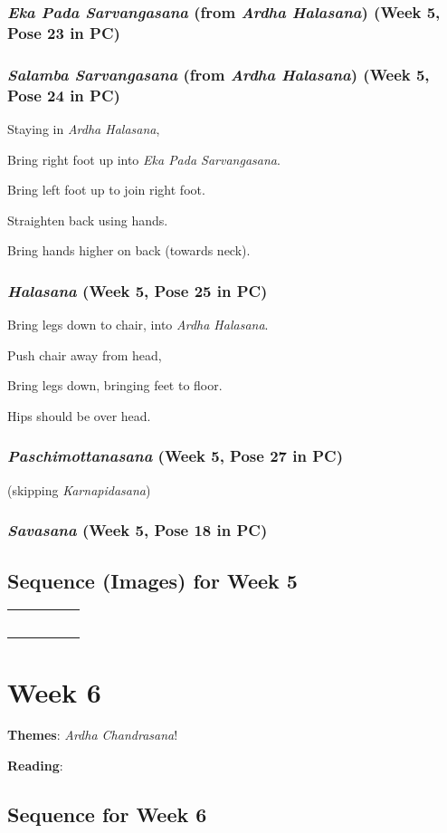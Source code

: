 \documentclass{book}
\newcommand{\apose}[1]{\emph{#1}}
\newcommand{\ardhal}{\apose{Ardha Halasana}}
\newcommand{\ardchand}{\apose{Ardha Chandrasana}}
\newcommand{\ekapadsarv}{\apose{Eka Pada Sarvangasana}}
\newcommand{\hal}{\apose{Halasana}}
\newcommand{\karn}{\apose{Karnapidasana}}
\newcommand{\paschi}{\apose{Paschimottanasana}}
\newcommand{\sarv}{\apose{Salamba Sarvangasana}}
\newcommand{\sav}{\apose{Savasana}}
\newcommand{\poseFig}[1]{
  \begin{minipage}{1.0in}
    \texttt{[image: Figures/\{"\#1"]}.jpg}
    \captionof{figure}{{#1}}
    \label{fig:\theweek.#1}
    \vspace{1ex}
  \end{minipage}
}
\newcommand{\amsFig}{\poseFig{Adho Mukha Svanasana}}
\newcommand{\ardhalFig}{\poseFig{Ardha Halasana}}
\newcommand{\ekapadsarvFig}{\poseFig{Eka Pada Sarvangasana}}
\newcommand{\gomuFig}{\poseFig{Gomukasana}}
\newcommand{\halFig}{\poseFig{Halasana}}
\newcommand{\namFig}{\poseFig{Namaskarasana}}
\newcommand{\padangFig}{\poseFig{Padangusthasana}}
\newcommand{\paschiFig}{\poseFig{Paschimottanasana}}
\newcommand{\paschbadhastFig}{\poseFig{Paschima Baddha Hastasana}}
\newcommand{\paschnamaFig}{\poseFig{Paschima Namaskarasana}}
\newcommand{\praspadFig}{\poseFig{Prasarita Padottanasana}}
\newcommand{\sarvFig}{\poseFig{Salamba Sarvangasana}}
\newcommand{\savFig}{\poseFig{Savasana}}
\newcommand{\tadFig}{\poseFig{Tadasana}}
\newcommand{\urdbadFig}{\poseFig{Urdhva Baddhanguliyasana}}
\newcommand{\urdhastFig}{\poseFig{Urdhva Hastasana}}
\newcommand{\urdnamFig}{\poseFig{Urdhva Namaskarasana}}
\newcommand{\utkaFig}{\poseFig{Utkatasana}}
\newcommand{\uttFig}{\poseFig{Uttanasana}}
\newcommand{\utthastpadFig}{\poseFig{Utthita Hasta Padasana}}
\newcommand{\uttparsvaFig}{\poseFig{Utthita Parsvakonasana}}
\newcommand{\utttrikFig}{\poseFig{Utthita Trikonasana}}
\newcommand{\vimFig}{\poseFig{Vimanasana}}
\newcommand{\viraiFig}{\poseFig{Virabhdrasana I}}
\newcommand{\viraiiFig}{\poseFig{Virabhadrasana II}}
\newcommand{\vrkFig}{\poseFig{Vrksasana}}
\newcommand{\PC}[2]{{\normalfont\normalsize \hfill(Week #1, Pose #2 in PC)}}
\newcommand{\newpose}[1]{{{#1}}}
\newcounter{week}
\newcounter{pose}
\newcommand{\week}[1]
{ \IfDecimal{#1}{\setcounter{week}{\integerpart}}{fooey}
  \setcounter{pose}{1}
  \chapter{Week {#1}}}
\newcommand{\pose}{\subsection}
\begin{document}
\pose{\newpose{\ekapadsarv{}} (from \ardhal{})  \PC{5}{23}}


\pose{\newpose{\sarv{}} (from \ardhal{})  \PC{5}{24}}


Staying in \ardhal{},

Bring right foot up into \ekapadsarv{}.

Bring left foot up to join right foot.

Straighten back using hands.

Bring hands higher on back (towards neck).

\pose{\newpose{\hal{}}  \PC{5}{25}}


Bring legs down to chair, into \ardhal{}.

Push chair away from head,

Bring legs down, bringing feet to floor.

Hips should be over head.

\pose{\paschi{}  \PC{5}{27}}

    (skipping \karn{})

\pose{\sav{}  \PC{5}{18}}


\section{Sequence (Images) for Week 5}
\label{seqimags:5}

\begin{tabular}{|c|c|c|c|c|}
\tadFig{} & 
\urdhastFig{} & 
\urdbadFig{} & 
\namFig{} & 
\urdnamFig{} \\ \hline
\paschbadhastFig{} & 
\gomuFig{} & 
\paschnamaFig{} & 
\vrkFig{} & 
\utkaFig{} \\ \hline
\utthastpadFig{}  & 
\uttparsvaFig{} & 
\utttrikFig{} & 
\viraiiFig{} & 
\uttparsvaFig{} \\ \hline
\vimFig{} & 
\viraiFig{} & 
\praspadFig{} & 
\amsFig{} & 
\uttFig{} \\ \hline
\padangFig{} & 
\ardhalFig{} & 
\ekapadsarvFig{} & 
\sarvFig{} & 
\halFig{} \\ \hline
\paschiFig{} & 
\savFig{}
\end{tabular}

\week{6}
\label{week:6}

\textbf{Themes}: \ardchand{}!

\textbf{Reading}: 

\section{Sequence for Week 6}
\label{seq:6}
\end{document}
